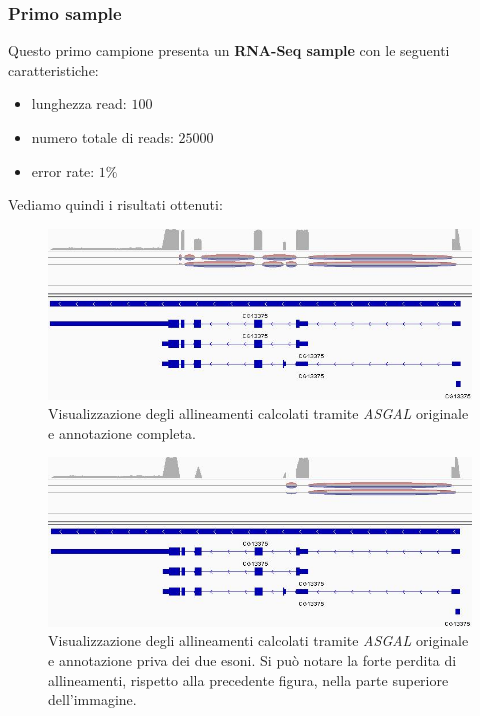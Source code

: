 \documentclass[a4paper,12pt, oneside]{book}
\begin{document}
\subsubsection{Primo sample}
Questo primo campione presenta un \textbf{RNA-Seq sample} con le seguenti
caratteristiche:
\begin{itemize}
  \item lunghezza read: $100$
  \item numero totale di reads: $25000$
  \item error rate: $1\%$
\end{itemize}
Vediamo quindi i risultati ottenuti:
\begin{figure}[H]
  \centering
  \includegraphics[scale = 0.55]{img/igvorig.jpg}
  \caption{Visualizzazione degli allineamenti calcolati tramite \textit{ASGAL}
    originale e annotazione completa.}
  \label{r1}
\end{figure}
\begin{figure}[H]
  \centering
  \includegraphics[scale = 0.55]{img/igvnoe.jpg}
  \caption{Visualizzazione degli allineamenti calcolati tramite \textit{ASGAL}
    originale e annotazione priva dei due esoni. Si può notare la forte perdita
    di allineamenti, rispetto alla precedente figura, nella parte superiore
    dell'immagine.}
  \label{r2}
\end{figure}
\end{document}
